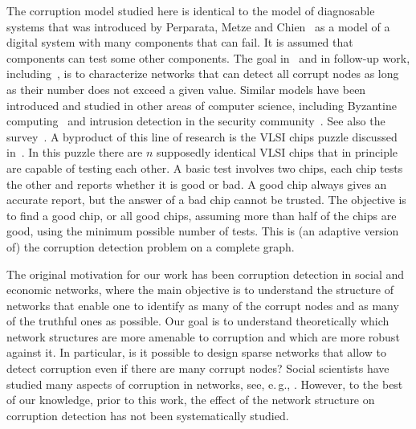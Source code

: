 \documentclass[11pt]{article}
\numberwithin{equation}{section}
\theoremstyle{definition}
\theoremstyle{plain}
\newcommand{\eg}{e.\,g.}
\begin{document}
The corruption model studied here is identical 
to the model of diagnosable systems 
that was introduced by Perparata, Metze and Chien~\cite{PMC67} 
as a model of a digital system 
with many components that can 
%
fail. 
It is assumed that components can test 
some other components. The goal in~\cite{PMC67} and
%
in follow-up  %
work,   %
including~\cite{HA74,KTA75,KR80},  %
%
is to characterize networks that can detect 
%
%
%
%
%
all  %
corrupt  %
nodes 
as long as their number does not exceed a given value.
%
%
%
%
Similar models
%
have been   %
introduced and studied in other areas of computer science, 
including Byzantine computing~\cite{LSP} and intrusion 
detection in the security community~\cite{mukherjee1994network}. 
See also the survey~\cite{lgorzata2004survey}.
A byproduct of this line of research is the VLSI chips puzzle discussed
in~\cite[Problems~4-6]{CLRS}. In this puzzle there are $n$ supposedly
identical VLSI chips that in principle are capable of
testing each other. A basic test involves two chips,
each chip tests the other and reports whether
it is good or bad. A good chip always
%
%
gives an accurate report,   %
but the answer of a bad chip cannot be trusted.
The objective is to find a good chip, or all good chips, assuming
more than half of the chips are good, using the minimum possible number
of tests.  This is (an adaptive version of) 
the corruption detection problem
on a complete graph. 
%
%
%

%
%

The original motivation for our work has been 
corruption detection in social and economic networks,
where the main objective is to understand the
structure of networks that enable one to identify as many of the corrupt
nodes and as many of the truthful ones as possible. 
%
%
%
%
%
%
%
Our goal is to understand theoretically 
which network structures are more amenable to corruption and which are
more robust against it. In particular, is it possible to design sparse 
networks that allow to detect corruption even if there are many corrupt nodes? 
Social scientists have studied many 
%
aspects of corruption in networks, %
see, \eg, %
\cite{nielsen2003corruption,rock2004comparative,fjeldstad2003fighting}.
However, to the best of our knowledge, prior to this
%
%
%
%
work, the effect of the network structure on corruption detection %
has not been systematically studied.     %
\end{document}
